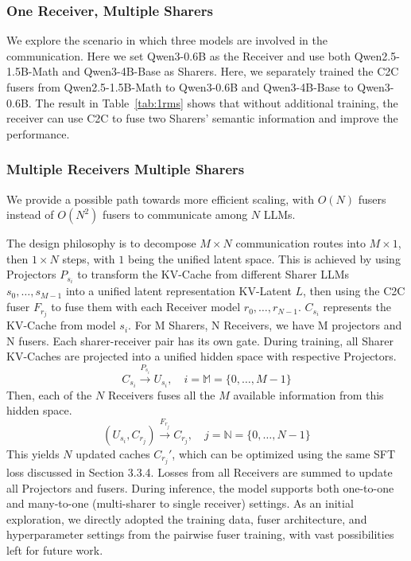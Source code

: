 \subsubsection{One Receiver, Multiple Sharers}
\label{sec:appendix/many2one}

We explore the scenario in which three models are involved in the communication. Here we set Qwen3-0.6B as the Receiver and use both Qwen2.5-1.5B-Math and Qwen3-4B-Base as Sharers. Here, we separately trained the C2C fusers from Qwen2.5-1.5B-Math to Qwen3-0.6B and Qwen3-4B-Base to Qwen3-0.6B. The result in Table~\ref{tab:1rms} shows that without additional training, the receiver can use C2C to fuse two Sharers' semantic information and improve the performance.

\subsubsection{Multiple Receivers Multiple Sharers}
\label{sec:appendix/many2many}

We provide a possible path towards more efficient scaling, with $O(N)$ fusers instead of $O(N^2)$ fusers to communicate among $N$ LLMs.

The design philosophy is to decompose $M\times N$ communication routes into $M\times 1$, then $1\times N$ steps, with $1$ being the unified latent space.
This is achieved by using Projectors $P_{s_i}$ to transform the KV-Cache from different Sharer LLMs $s_0,\dots,s_{M-1}$ into a unified latent representation KV-Latent $L$, then using the C2C fuser $F_{r_j}$ to fuse them with each Receiver model $r_0,\dots,r_{N-1}$. $C_{s_i}$ represents the KV-Cache from model $s_i$.
For M Sharers, N Receivers, we have M projectors and N fusers. Each sharer-receiver pair has its own gate. 
During training, all Sharer KV-Caches are projected into a unified hidden space with respective Projectors.
$$
C_{s_i} \xrightarrow{P_{s_i}} U_{s_i}, \quad i=\mathbb{M}=\{0,\dots,M-1\}
$$
Then, each of the $N$ Receivers fuses all the $M$ available information from this hidden space.
$$
(U_{s_i}, C_{r_j}) \xrightarrow{F_{r_j}} C_{r_j}, \quad j=\mathbb{N}=\{0,\dots,N-1\}
$$
This yields $N$ updated caches $C_{r_j}'$, which can be optimized using the same SFT loss discussed in Section 3.3.4. 
Losses from all Receivers are summed to update all Projectors and fusers.
During inference, the model supports both one-to-one and many-to-one (multi-sharer to single receiver) settings. 
As an initial exploration, we directly adopted the training data, fuser architecture, and hyperparameter settings from the pairwise fuser training, with vast possibilities left for future work.

